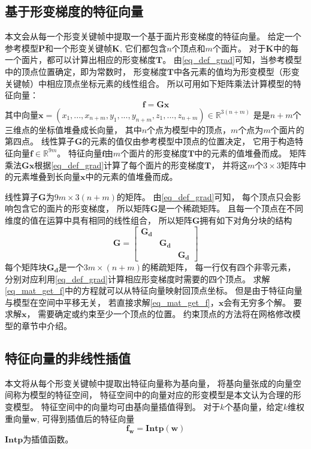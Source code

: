 \subsection{基于形变梯度的特征向量}\label{sec_feature}
本文会从每一个形变关键帧中提取一个基于面片形变梯度的特征向量。
给定一个参考模型$\bm{P}$和一个形变关键帧$\bm{K}$,
它们都包含$n$个顶点和$m$个面片。
对于$\bm{K}$中的每一个面片，都可以计算出相应的形变梯度$\bm{T}$。
由\ref{eq_def_grad}可知，当参考模型中的顶点位置确定，即为常数时，
形变梯度$\bm{T}$中各元素的值均为形变模型（形变关键帧）中相应顶点坐标元素的线性组合。
所以可用如下矩阵乘法计算模型的特征向量：
\begin{equation}
    \label{eq_mat_get_f}
    \bm{f}=\bm{G}\bm{x}
\end{equation}
其中向量$\bm{x}=(x_1,...,x_{n+m},y_1,...,y_{n+m},z_1,...,z_{n+m}) \in \mathbb{R}^{3(n+m)}$
是是$n+m$个三维点的坐标值堆叠成长向量，
其中$n$个点为模型中的顶点，$m$个点为$m$个面片的第四点。
线性算子$\bm{G}$的元素的值仅由参考模型中顶点的位置决定，
它用于构造特征向量$\bm{f}\in\mathbb{R}^{9m}$。
特征向量$\bm{f}$由$m$个面片的形变梯度$\bm{T}$中的元素的值堆叠而成。
矩阵乘法$\bm{Gx}$根据\ref{eq_def_grad}计算了每个面片的形变梯度$\bm{T}$，
并将这$m$个$3 \times 3$矩阵中的元素堆叠到长向量$\bm{x}$中的元素的值堆叠而成。

线性算子$\bm{G}$为$9m\times 3(n+m)$的矩阵。
由\ref{eq_def_grad}可知，
每个顶点只会影响包含它的面片的形变梯度，
所以矩阵$\bm{G}$是一个稀疏矩阵。
且每一个顶点在不同维度的值在运算中具有相同的线性组合，
所以矩阵$\bm{G}$拥有如下对角分块的结构
\begin{equation}
    \bm{G}=
    \begin{bmatrix}
        \bm{G_d} &        & \\ 
         &       \bm{G_d} & \\ 
         &       &        \bm{G_d}
    \end{bmatrix}
\end{equation}
每个矩阵块$\bm{G_d}$是一个$3m \times (n+m)$的稀疏矩阵，
每一行仅有四个非零元素，
分别对应利用\ref{eq_def_grad}计算相应形变梯度时需要的四个顶点。
求解\ref{eq_mat_get_f}中的方程就可以从特征向量映射回顶点坐标。
但是由于特征向量与模型在空间中平移无关，
若直接求解\ref{eq_mat_get_f}，$\bm{x}$会有无穷多个解。
要求解$\bm{x}$，
需要确定或约束至少一个顶点的位置。
约束顶点的方法将在网格修改模型的章节中介绍。
\subsection{特征向量的非线性插值}
本文将从每个形变关键帧中提取出特征向量称为基向量，
将基向量张成的向量空间称为模型的特征空间，
特征空间中的向量对应的形变模型是本文认为合理的形变模型。
特征空间中的向量均可由基向量插值得到。
对于$k$个基向量，给定$k$维权重向量$\bm{w}$,
可得到插值后的特征向量
\begin{equation}
    \label{eq_intp}
    \bm{f_w}=\bm{Intp}(\bm{w})
\end{equation}
$\bm{Intp}$为插值函数。

